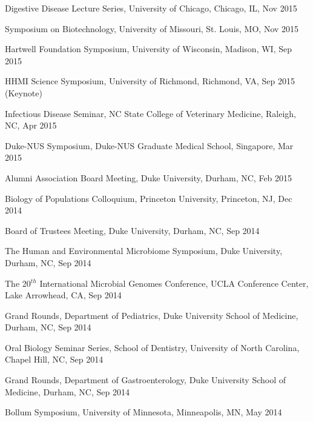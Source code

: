 \documentclass[overlapped,line,11pt]{res}
\begin{document}
\begin{resume}
\begin{revnumerate}[69]
\item {Digestive Disease Lecture Series, University of Chicago, Chicago, IL, Nov 2015}

\item {Symposium on Biotechnology, University of Missouri, St. Louis, MO, Nov 2015}

\item {Hartwell Foundation Symposium, University of Wisconsin, Madison, WI, Sep 2015}

\item {HHMI Science Symposium, University of Richmond, Richmond, VA, Sep 2015 (Keynote)}

\item {Infectious Disease Seminar, NC State College of Veterinary Medicine, Raleigh, NC, Apr 2015}

\item {Duke-NUS Symposium, Duke-NUS Graduate Medical School, Singapore, Mar 2015}

\item {Alumni Association Board Meeting, Duke University,
  Durham, NC, Feb 2015
  }

\item {Biology of Populations Colloquium, Princeton University, Princeton, NJ, Dec 2014
  }

\item {Board of Trustees Meeting, Duke University,
  Durham, NC, Sep 2014
  }

\item { The Human and Environmental Microbiome Symposium, Duke University,
  Durham, NC, Sep 2014
  }

\item {The 20$^{th}$ International Microbial Genomes Conference, UCLA
  Conference Center, Lake Arrowhead, CA, Sep 2014
  }

\item {Grand Rounds, Department of Pediatrics, Duke University School of
  Medicine, Durham, NC, Sep 2014
  }

\item {Oral Biology Seminar Series, School of Dentistry, University of
  North Carolina, Chapel Hill, NC, Sep 2014
  }

\item {Grand Rounds, Department of Gastroenterology, Duke University School of
  Medicine, Durham, NC, Sep 2014
  }

\item {Bollum Symposium, University of Minnesota, Minneapolis, MN, May 2014
  }


\end{revnumerate}
\end{resume}
\end{document}
